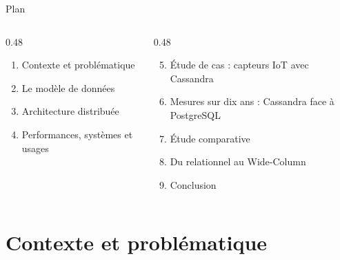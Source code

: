\documentclass[aspectratio=169,10pt]{beamer}
\begin{document}
\begin{frame}{Plan}
  \begin{columns}[T]
    \begin{column}{0.48\textwidth}
      \begin{enumerate}
        \item Contexte et problématique
        \item Le modèle de données
        \item Architecture distribuée
        \item Performances, systèmes et usages
      \end{enumerate}
    \end{column}
    \begin{column}{0.48\textwidth}
      \begin{enumerate}\setcounter{enumi}{4}
        \item Étude de cas : capteurs IoT avec Cassandra
        \item Mesures sur dix ans : Cassandra face à PostgreSQL
        \item Étude comparative
        \item Du relationnel au Wide-Column
        \item Conclusion
      \end{enumerate}
    \end{column}
  \end{columns}
\end{frame}

\section{Contexte et problématique}
\end{document}
